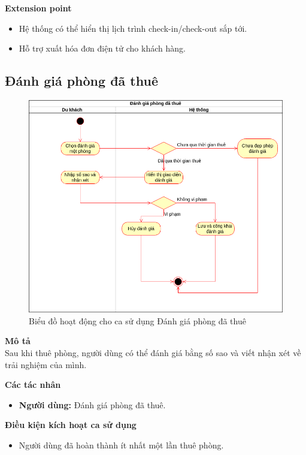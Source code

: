 \textbf{Extension point}
\begin{itemize}
    \item Hệ thống có thể hiển thị lịch trình check-in/check-out sắp tới.
    \item Hỗ trợ xuất hóa đơn điện tử cho khách hàng.
\end{itemize}


\subsection{Đánh giá phòng đã thuê}
\begin{figure}[H]
    \centering
    \includegraphics[width=\textwidth]{img/1.Tuyền-Đánh giá phòng đã thuê.drawio.png}
    \caption{Biểu đồ hoạt động cho ca sử dụng Đánh giá phòng đã thuê}
\end{figure}
\textbf{\indent Mô tả}\\
\indent Sau khi thuê phòng, người dùng có thể đánh giá bằng số sao và viết nhận xét về trải nghiệm của mình.

\textbf{Các tác nhân}
\begin{itemize}
    \item \textbf{Người dùng:} Đánh giá phòng đã thuê.
\end{itemize}

\textbf{Điều kiện kích hoạt ca sử dụng}
\begin{itemize}
    \item Người dùng đã hoàn thành ít nhất một lần thuê phòng.
\end{itemize}

